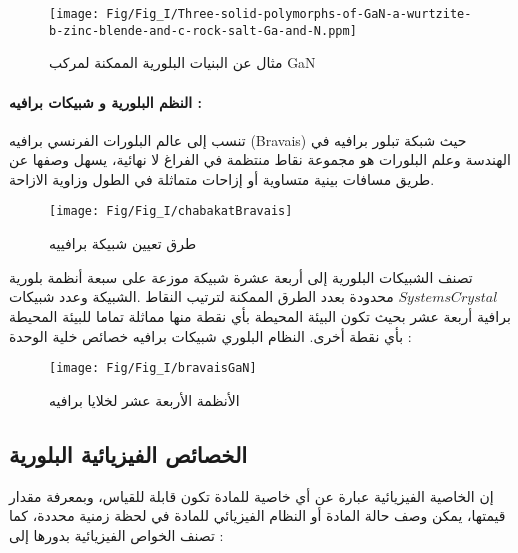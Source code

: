 \begin{figure}[bh]
	\centering
	\texttt{[image: Fig/Fig\_I/Three-solid-polymorphs-of-GaN-a-wurtzite-b-zinc-blende-and-c-rock-salt-Ga-and-N.ppm]}
	\caption{مثال عن البنيات البلورية الممكنة لمركب GaN }
	\label{fig:three-solid-polymorphs-of-gan-a-wurtzite-b-zinc-blende-and-c-rock-salt-ga-and-n}
\end{figure}
\FloatBarrier

\paragraph{النظم البلورية و شبيكات برافيه : }
تنسب إلى عالم البلورات الفرنسي برافيه (Bravais) حيث شبكة تبلور برافيه في الهندسة وعلم البلورات هو مجموعة نقاط منتظمة في الفراغ لا نهائية، يسهل وصفها عن طريق مسافات بينية متساوية أو إزاحات متماثلة في الطول وزاوية الازاحة. 

\begin{figure}[bh]
	\centering
	\texttt{[image: Fig/Fig\_I/chabakatBravais]}
	\caption{طرق تعيين شبيكة برافييه}
	\label{fig:chabakatbravais}
\end{figure}
\FloatBarrier

تصنف الشبيكات البلورية إلى أربعة عشرة شبيكة موزعة على سبعة أنظمة بلورية $ Systems Crystal $ محدودة بعدد الطرق الممكنة لترتيب النقاط .الشبيكة وعدد شبيكات برافية أربعة عشر بحيث تكون البيئة المحيطة بأي نقطة منها مماثلة تماما للبيئة المحيطة بأي نقطة أخرى.
النظام البلوري شبيكات برافيه خصائص خلية الوحدة : \cite{a1}

\begin{figure}[th]
	\centering
	\texttt{[image: Fig/Fig\_I/bravaisGaN]}
	\caption{الأنظمة الأربعة عشر لخلايا برافيه }
	\label{fig:bravaisgan}
\end{figure}
\FloatBarrier

\subsection{الخصائص الفيزيائية البلورية }
إن الخاصية الفيزيائية عبارة عن أي خاصية للمادة تكون قابلة للقياس، وبمعرفة مقدار قيمتها، يمكن وصف حالة المادة أو النظام الفيزيائي للمادة في لحظة زمنية محددة، كما تصنف الخواص الفيزيائية بدورها إلى : 

